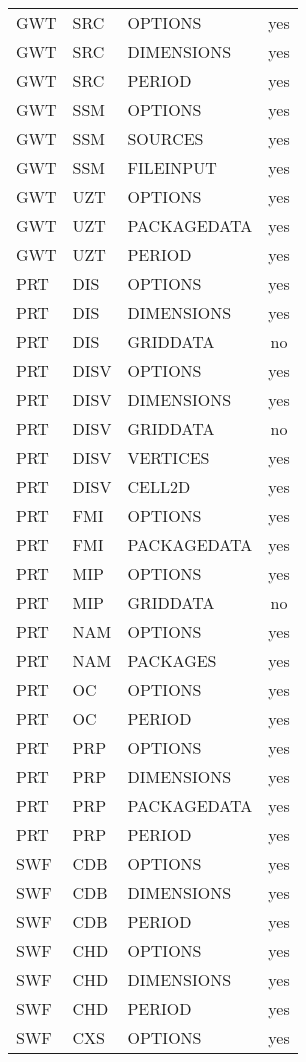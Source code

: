 \begin{longtable}{p{1.5cm} p{1.5cm} p{3cm} c}
\hline
GWT & SRC & OPTIONS & yes \\ 
GWT & SRC & DIMENSIONS & yes \\ 
GWT & SRC & PERIOD & yes \\ 
\hline
GWT & SSM & OPTIONS & yes \\ 
GWT & SSM & SOURCES & yes \\ 
GWT & SSM & FILEINPUT & yes \\ 
\hline
GWT & UZT & OPTIONS & yes \\ 
GWT & UZT & PACKAGEDATA & yes \\ 
GWT & UZT & PERIOD & yes \\ 
\hline
PRT & DIS & OPTIONS & yes \\ 
PRT & DIS & DIMENSIONS & yes \\ 
PRT & DIS & GRIDDATA & no \\ 
\hline
PRT & DISV & OPTIONS & yes \\ 
PRT & DISV & DIMENSIONS & yes \\ 
PRT & DISV & GRIDDATA & no \\ 
PRT & DISV & VERTICES & yes \\ 
PRT & DISV & CELL2D & yes \\ 
\hline
PRT & FMI & OPTIONS & yes \\ 
PRT & FMI & PACKAGEDATA & yes \\ 
\hline
PRT & MIP & OPTIONS & yes \\ 
PRT & MIP & GRIDDATA & no \\ 
\hline
PRT & NAM & OPTIONS & yes \\ 
PRT & NAM & PACKAGES & yes \\ 
\hline
PRT & OC & OPTIONS & yes \\ 
PRT & OC & PERIOD & yes \\ 
\hline
PRT & PRP & OPTIONS & yes \\ 
PRT & PRP & DIMENSIONS & yes \\ 
PRT & PRP & PACKAGEDATA & yes \\ 
PRT & PRP & PERIOD & yes \\ 
\hline
SWF & CDB & OPTIONS & yes \\ 
SWF & CDB & DIMENSIONS & yes \\ 
SWF & CDB & PERIOD & yes \\ 
\hline
SWF & CHD & OPTIONS & yes \\ 
SWF & CHD & DIMENSIONS & yes \\ 
SWF & CHD & PERIOD & yes \\ 
\hline
SWF & CXS & OPTIONS & yes \\ 

\end{longtable}
